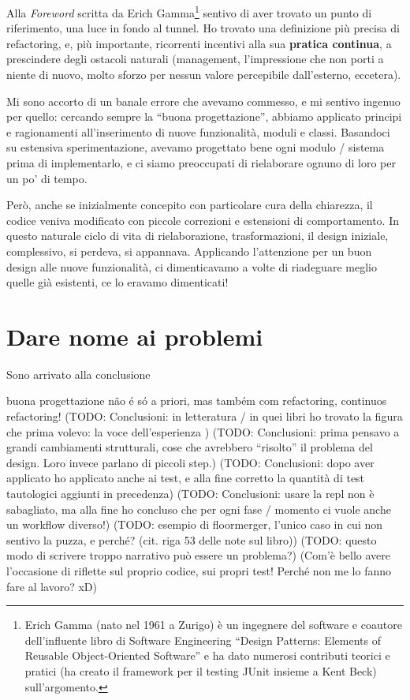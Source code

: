 \documentclass[12pt]{report}
\begin{document}
Alla \textit{Foreword} scritta da Erich Gamma\footnote{
Erich Gamma (nato nel 1961 a Zurigo) è un ingegnere del software e
coautore dell'influente libro di Software Engineering ``Design Patterns: 
Elements of Reusable Object-Oriented Software'' e ha dato numerosi contributi
teorici e pratici (ha creato il framework per il testing JUnit insieme
a Kent Beck) sull'argomento.}
sentivo di aver trovato un punto di 
riferimento, una luce in fondo al tunnel. Ho trovato una definizione più precisa
di refactoring, e, più importante, ricorrenti incentivi alla sua 
\textbf{pratica continua}, a prescindere degli ostacoli naturali (management, 
l'impressione che non porti a niente di nuovo, molto sforzo per nessun valore
percepibile dall'esterno, eccetera).

Mi sono accorto di un banale errore che avevamo commesso, e mi 
sentivo ingenuo per quello: cercando sempre la ``buona progettazione'', 
abbiamo applicato principi e ragionamenti all'inserimento di nuove 
funzionalità, moduli e classi. Basandoci su estensiva sperimentazione, 
avevamo progettato bene ogni modulo / sistema prima di implementarlo, e ci
siamo preoccupati di rielaborare ognuno di loro per un po' di tempo.

Però, anche se inizialmente concepito con particolare cura della chiarezza, 
il codice veniva modificato con piccole correzioni e estensioni di 
comportamento. In questo naturale ciclo di vita di rielaborazione, 
trasformazioni, il design iniziale, complessivo, si perdeva, si appannava. 
Applicando l'attenzione per un buon design alle nuove funzionalità, ci 
dimenticavamo a volte di riadeguare meglio quelle già esistenti, ce lo 
eravamo dimenticati!

\section*{Dare nome ai problemi}

Sono arrivato alla conclusione


buona progettazione não é só a priori, mas também com refactoring,
continuos refactoring!
(TODO: Conclusioni: in letteratura / in quei libri ho trovato la
figura che prima volevo: la voce dell'esperienza )
(TODO: Conclusioni: prima pensavo a grandi cambiamenti strutturali,
cose che avrebbero ``risolto'' il problema del design. Loro invece
parlano di piccoli step.)
(TODO: Conclusioni: dopo aver applicato ho applicato anche ai test, e
alla fine corretto la quantità di test tautologici aggiunti in precedenza)
(TODO: Conclusioni: usare la repl non è sabagliato, ma alla fine ho
concluso che per ogni fase / momento ci vuole anche un workflow diverso!)
(TODO: esempio di floormerger, l'unico caso in cui non sentivo la
puzza, e perché? (cit. riga 53 delle note sul libro))
(TODO: questo modo di scrivere troppo narrativo può essere un problema?)
(Com'è bello avere l'occasione di riflette sul proprio codice, sui
propri test! Perché non me lo fanno fare al lavoro? xD)
%
\end{document}
